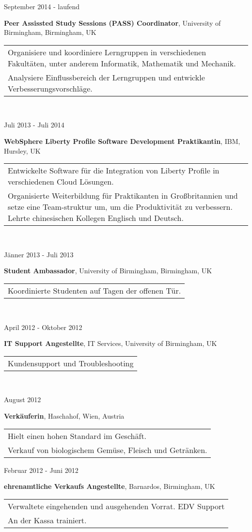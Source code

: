 \documentclass{article}
\newenvironment{changemargin}[2]{%
  \begin{list}{}{%
    \setlength{\topsep}{0pt}%
    \setlength{\leftmargin}{#1}%
    \setlength{\rightmargin}{#2}%
    \setlength{\listparindent}{\parindent}%
    \setlength{\itemindent}{\parindent}%
    \setlength{\parsep}{\parskip}%
  }%
  \item[]}{\end{list}
}
\newenvironment{body} {
	\vspace*{-16pt}
	\begin{changemargin}{0in}{0in}
  }	
	{
\end{changemargin}
\medskip
}
\newcommand{\paraW}[4]{
	\begin{minipage}[t]{0.6\textwidth}
	\textbf{#1}, #2, #3 \vspace{2pt}\\
	\begin{tabular}{p{10cm}}
		#4
	\end{tabular}
	\end{minipage}
	\medskip
}
\newcommand{\timerange}[1]{
	\begin{minipage}[t]{0.30\textwidth}
		#1
	\end{minipage}
}
\begin{document}
\begin{body}
	\vspace{14pt}
	
	\timerange{September 2014 - laufend}
	\paraW{Peer Assissted Study Sessions (PASS) Coordinator}{University of Birmingham}{Birmingham, UK}{
		Organisiere und koordiniere Lerngruppen in verschiedenen Fakultäten, unter anderem Informatik, Mathematik und Mechanik.\\
		Analysiere Einflussbereich der Lerngruppen und entwickle Verbesserungsvorschläge.
	}\\
	
	\timerange{Juli 2013 - Juli 2014}
	\paraW{WebSphere Liberty Profile Software Development Praktikantin}{IBM}{Hursley, UK}{
		Entwickelte Software für die Integration von Liberty Profile in verschiedenen Cloud L{\"o}sungen.\\
		Organisierte Weiterbildung f{\"u}r Praktikanten in Großbritannien und setze eine Team-struktur um, um die Produktivität zu verbessern.
		Lehrte chinesischen Kollegen Englisch und Deutsch.\\
	}\\
	
	\timerange{J{\"a}nner 2013 - Juli 2013}
	\paraW{Student Ambassador}{University of Birmingham}{Birmingham, UK}{
		Koordinierte Studenten auf Tagen der offenen Tür.	
	}\\
	
	\timerange{April 2012 - Oktober 2012}
	\paraW{IT Support Angestellte}{IT Services}{University of Birmingham, UK}{
		Kundensupport und Troubleshooting
	}\\

	\timerange{August 2012}
	\paraW{Verkäuferin}{Haschahof}{Wien, Austria}{
		Hielt einen hohen Standard im Geschäft. \\ %
		Verkauf von biologischem Gemüse, Fleisch und Getränken. \\
	}
	
	\timerange{Februar 2012 - Juni 2012}
	\paraW{ehrenamtliche Verkaufs Angestellte}{Barnardos}{Birmingham, UK}{
		Verwaltete eingehenden und ausgehenden Vorrat.
		EDV Support\\
		An der Kassa trainiert.\\
	}


\end{body}
\end{document}
